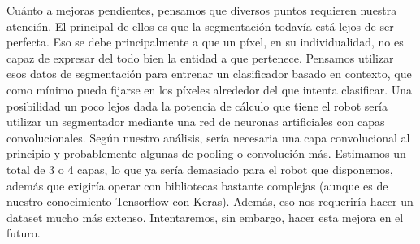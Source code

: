 \documentclass{article}
\begin{document}
	Cuánto a mejoras pendientes, pensamos que diversos puntos requieren nuestra atención. El principal de ellos es que la segmentación todavía está lejos de ser perfecta. Eso se debe principalmente a que un píxel, en su individualidad, no es capaz de expresar del todo bien la entidad a que pertenece. Pensamos utilizar esos datos de segmentación para entrenar un clasificador basado en contexto, que como mínimo pueda fijarse en los píxeles alrededor del que intenta clasificar. Una posibilidad un poco lejos dada la potencia de cálculo que tiene el robot sería utilizar un segmentador mediante una red de neuronas artificiales con capas convolucionales. Según nuestro análisis, sería necesaria una capa convolucional al principio y probablemente algunas de pooling o convolución más. Estimamos un total de 3 o 4 capas, lo que ya sería demasiado para el robot que disponemos, además que exigiría operar con bibliotecas bastante complejas (aunque es de nuestro conocimiento Tensorflow con Keras). Además, eso nos requeriría hacer un dataset mucho más extenso. Intentaremos, sin embargo, hacer esta mejora en el futuro.








\end{document}
